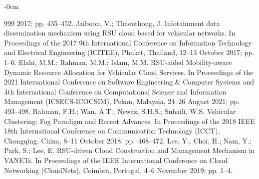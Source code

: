 \documentclass[sensors,article,accept,moreauthors,pdftex]{Definitions/mdpi}
\begin{document}
\begin{adjustwidth}{-\extralength}{0cm}
\begin{thebibliography}{999}
  2017; pp. 435--452.
Jaiboon, V.; Thaenthong, J. Infotainment data dissemination mechanism using RSU cloud based for vehicular networks. In Proceedings of the 2017 9th International Conference on Information Technology and Electrical Engineering (ICITEE), Phuket, Thailand, 12--13 October 2017; pp. 1--6.
Elahi, M.M.; Rahman, M.M.; Islam, M.M. RSU-aided Mobility-aware Dynamic Resource Allocation for Vehicular Cloud Services. In Proceedings of the 2021 International Conference on Software Engineering \& Computer Systems and 4th International Conference on Computational Science and Information Management (ICSECS-ICOCSIM), Pekan, Malaysia,  24--26 August 2021; pp. 493--498.
Rahman, F.H.; Wan, A.T.; Newaz, S.H.S.; Suhaili, W.S. Vehicular Clustering: Fog Paradigm and Recent Advances. In Proceedings of the 2018 IEEE 18th International Conference on Communication Technology (ICCT), Chongqing, China, 8--11 October 2018; pp.~468--472.
Lee, Y.; Choi, H.; Nam, Y.; Park, S.; Lee, E. RSU-driven Cloud Construction and Management Mechanism in VANETs. In Proceedings of the IEEE International Conference on Cloud Networking (CloudNets), Coimbra, Portugal, 4--6 November 2019; pp. 1--4.


\end{thebibliography}
\end{adjustwidth}
\end{document}
